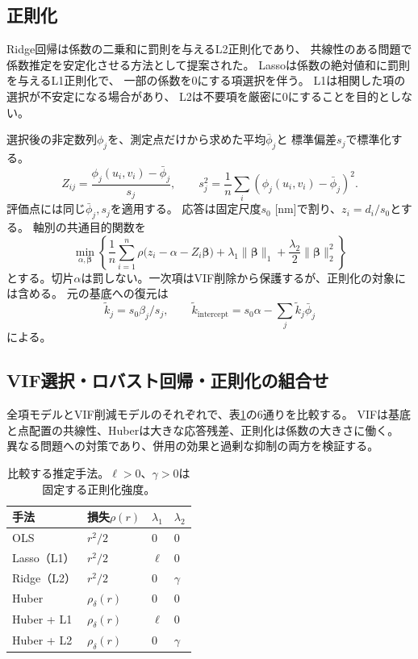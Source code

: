 \documentclass[11pt,a4paper]{ltjsarticle}
\begin{document}
\subsection{正則化}
Ridge回帰は係数の二乗和に罰則を与えるL2正則化であり、
共線性のある問題で係数推定を安定化させる方法として提案された\cite{hoerl1970}。
Lassoは係数の絶対値和に罰則を与えるL1正則化で、
一部の係数を0にする項選択を伴う\cite{tibshirani1996}。
L1は相関した項の選択が不安定になる場合があり、
L2は不要項を厳密に0にすることを目的としない。

選択後の非定数列$\phi_j$を、測定点だけから求めた平均$\bar\phi_j$と
標準偏差$s_j$で標準化する。
\begin{equation}
 Z_{ij}=\frac{\phi_j(u_i,v_i)-\bar\phi_j}{s_j},\qquad
 s_j^2=\frac1n\sum_i(\phi_j(u_i,v_i)-\bar\phi_j)^2.
 \label{eq:standardize}
\end{equation}
評価点には同じ$\bar\phi_j,s_j$を適用する。
応答は固定尺度$s_0$ [nm]で割り、$z_i=d_i/s_0$とする。
軸別の共通目的関数を
\begin{equation}
 \min_{\alpha,\bm\beta}\left\{
  \frac1n\sum_{i=1}^n\rho\bigl(z_i-\alpha-Z_i\bm\beta\bigr)
  +\lambda_1\|\bm\beta\|_1+\frac{\lambda_2}{2}\|\bm\beta\|_2^2
 \right\}
 \label{eq:objective}
\end{equation}
とする。切片$\alpha$は罰しない。一次項はVIF削除から保護するが、正則化の対象には含める。
元の基底への復元は
\begin{equation}
 \widetilde k_j=s_0\beta_j/s_j,\qquad
 \widetilde k_{\mathrm{intercept}}=s_0\alpha-
 \sum_j\widetilde k_j\bar\phi_j
 \label{eq:restore}
\end{equation}
による。

\subsection{VIF選択・ロバスト回帰・正則化の組合せ}
全項モデルとVIF削減モデルのそれぞれで、表\ref{tab:estimators}の6通りを比較する。
VIFは基底と点配置の共線性、Huberは大きな応答残差、正則化は係数の大きさに働く。
異なる問題への対策であり、併用の効果と過剰な抑制の両方を検証する。

\begin{table}[htbp]
\centering
\caption{比較する推定手法。$\ell>0$、$\gamma>0$は固定する正則化強度。}
\label{tab:estimators}
\begin{tabular}{llll}
\toprule
手法 & 損失$\rho(r)$ & $\lambda_1$ & $\lambda_2$\\
\midrule
OLS & $r^2/2$ & 0 & 0\\
Lasso（L1） & $r^2/2$ & $\ell$ & 0\\
Ridge（L2） & $r^2/2$ & 0 & $\gamma$\\
Huber & $\rho_\delta(r)$ & 0 & 0\\
Huber + L1 & $\rho_\delta(r)$ & $\ell$ & 0\\
Huber + L2 & $\rho_\delta(r)$ & 0 & $\gamma$\\
\bottomrule
\end{tabular}
\end{table}
\end{document}
